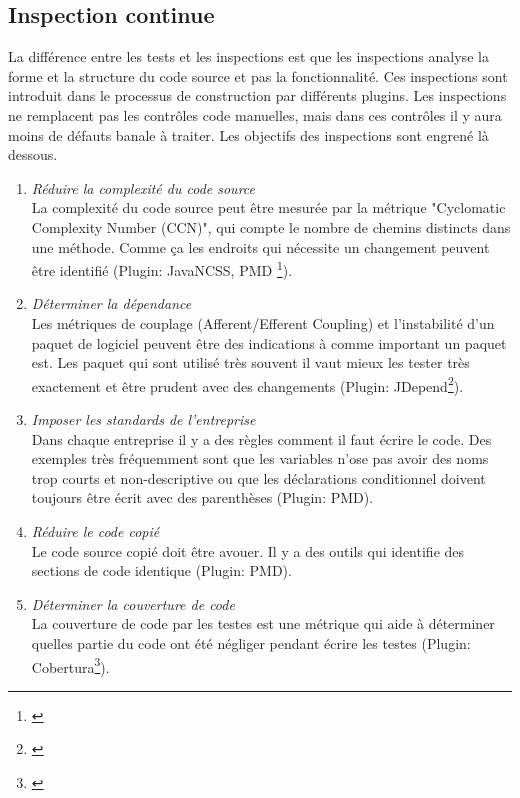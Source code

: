 \subsection{Inspection continue}

La différence entre les tests et les inspections est que les inspections analyse la forme et la structure du code source et pas la fonctionnalité. Ces inspections sont introduit dans le processus de construction par différents plugins. Les inspections ne remplacent pas les contrôles code manuelles, mais dans ces contrôles il y aura moins de défauts banale à traiter. Les objectifs des inspections sont engrené là dessous.

\begin{enumerate}

\item \textit{Réduire la complexité du code source} \\ La complexité du code source peut être mesurée par la métrique "Cyclomatic Complexity Number (CCN)", qui compte le nombre de chemins distincts dans une méthode. Comme ça les endroits qui nécessite un changement peuvent être identifié (Plugin: JavaNCSS, PMD \footnote{\citep{pluginpmd}}).

\item \textit{Déterminer la dépendance} \\ Les métriques de couplage (Afferent/Efferent Coupling) et l'instabilité d'un paquet de logiciel peuvent être des indications à comme important un paquet est. Les paquet qui sont utilisé très souvent il vaut mieux les tester très exactement et être prudent avec des changements (Plugin: JDepend\footnote{\citep{pluginjdepend}}).

\item \textit{Imposer les standards de l'entreprise}\\ Dans chaque entreprise il y a des règles comment il faut écrire le code. Des exemples très fréquemment sont que les variables n'ose pas avoir des noms trop courts et non-descriptive ou que les déclarations conditionnel doivent toujours être écrit avec des parenthèses (Plugin: PMD).

\item \textit{Réduire le code copié} \\ Le code source copié doit être avouer. Il y a des outils qui identifie des sections de code identique (Plugin: PMD).

\item \textit{Déterminer la couverture de code} \\ La couverture de code par les testes est une métrique qui aide à déterminer quelles partie du code ont été négliger pendant écrire les testes (Plugin: Cobertura\footnote{\citep{plugincobertura}}).

\end{enumerate}

